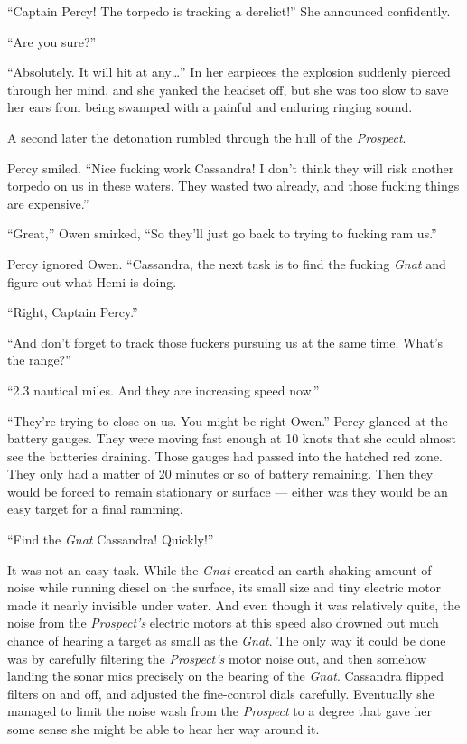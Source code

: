 \documentclass[
]{scrbook}
\begin{document}
``Captain Percy! The torpedo is tracking a derelict!'' She announced
confidently.

``Are you sure?''

``Absolutely. It will hit at any\ldots{}'' In her earpieces the
explosion suddenly pierced through her mind, and she yanked the headset
off, but she was too slow to save her ears from being swamped with a
painful and enduring ringing sound.

A second later the detonation rumbled through the hull of the
\emph{Prospect}.

Percy smiled. ``Nice fucking work Cassandra! I don't think they will
risk another torpedo on us in these waters. They wasted two already, and
those fucking things are expensive.''

``Great,'' Owen smirked, ``So they'll just go back to trying to fucking
ram us.''

Percy ignored Owen. ``Cassandra, the next task is to find the fucking
\emph{Gnat} and figure out what Hemi is doing.

``Right, Captain Percy.''

``And don't forget to track those fuckers pursuing us at the same time.
What's the range?''

``2.3 nautical miles. And they are increasing speed now.''

``They're trying to close on us. You might be right Owen.'' Percy
glanced at the battery gauges. They were moving fast enough at 10 knots
that she could almost see the batteries draining. Those gauges had
passed into the hatched red zone. They only had a matter of 20 minutes
or so of battery remaining. Then they would be forced to remain
stationary or surface --- either was they would be an easy target for a
final ramming.

``Find the \emph{Gnat} Cassandra! Quickly!''

It was not an easy task. While the \emph{Gnat} created an earth-shaking
amount of noise while running diesel on the surface, its small size and
tiny electric motor made it nearly invisible under water. And even
though it was relatively quite, the noise from the \emph{Prospect's}
electric motors at this speed also drowned out much chance of hearing a
target as small as the \emph{Gnat}. The only way it could be done was by
carefully filtering the \emph{Prospect's} motor noise out, and then
somehow landing the sonar mics precisely on the bearing of the
\emph{Gnat}. Cassandra flipped filters on and off, and adjusted the
fine-control dials carefully. Eventually she managed to limit the noise
wash from the \emph{Prospect} to a degree that gave her some sense she
might be able to hear her way around it.
\end{document}
